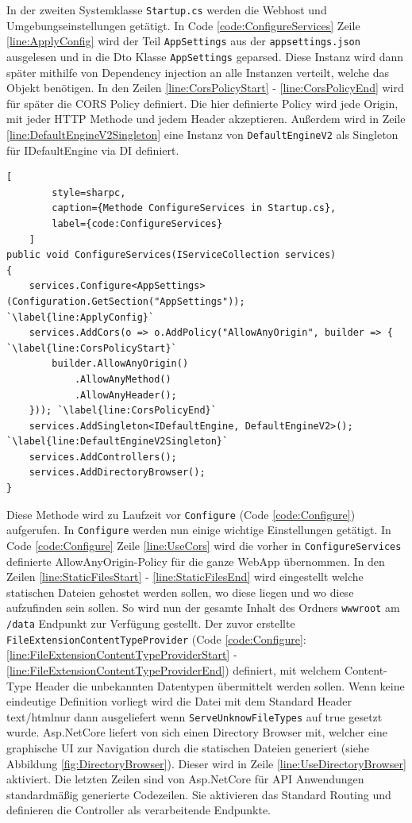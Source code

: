 In der zweiten Systemklasse \texttt{Startup.cs} werden die
Webhost und Umgebungseinstellungen getätigt.
In Code \ref{code:ConfigureServices} Zeile \ref{line:ApplyConfig}
wird der Teil \texttt{AppSettings} aus der
\texttt{appsettings.json} ausgelesen und in die Dto Klasse
\texttt{AppSettings} geparsed. Diese Instanz wird dann später
mithilfe von Dependency injection an alle Instanzen verteilt,
welche das Objekt benötigen. In den Zeilen \ref{line:CorsPolicyStart}
- \ref{line:CorsPolicyEnd} wird für später die CORS Policy definiert.
Die hier definierte Policy wird jede Origin, mit jeder HTTP Methode
und jedem Header akzeptieren. Außerdem wird in Zeile
\ref{line:DefaultEngineV2Singleton} eine Instanz von \texttt{DefaultEngineV2}
als Singleton für IDefaultEngine via DI definiert.

\begin{codeblock}
	\begin{lstlisting}[
		style=sharpc,
		caption={Methode ConfigureServices in Startup.cs},
		label={code:ConfigureServices}
	]
public void ConfigureServices(IServiceCollection services)
{
	services.Configure<AppSettings>(Configuration.GetSection("AppSettings"));	`\label{line:ApplyConfig}`
	services.AddCors(o => o.AddPolicy("AllowAnyOrigin", builder => { `\label{line:CorsPolicyStart}`
		builder.AllowAnyOrigin()
			.AllowAnyMethod()
			.AllowAnyHeader();
	})); `\label{line:CorsPolicyEnd}`
	services.AddSingleton<IDefaultEngine, DefaultEngineV2>(); `\label{line:DefaultEngineV2Singleton}`
	services.AddControllers();
	services.AddDirectoryBrowser();
}
	\end{lstlisting}
\end{codeblock}

Diese Methode wird zu Laufzeit vor \texttt{Configure}
(Code \ref{code:Configure}) aufgerufen. In \texttt{Configure} werden nun
einige wichtige Einstellungen getätigt. In Code \ref{code:Configure}
Zeile \ref{line:UseCors} wird die vorher in \texttt{ConfigureServices} definierte
\grqq AllowAnyOrigin\grqq -Policy für die ganze WebApp übernommen.
In den Zeilen \ref{line:StaticFilesStart} - \ref{line:StaticFilesEnd}
wird eingestellt welche statischen Dateien gehostet werden sollen,
wo diese liegen und wo diese aufzufinden sein sollen. So wird nun
der gesamte Inhalt des Ordners \texttt{wwwroot} am \texttt{/data} Endpunkt zur
Verfügung gestellt. Der zuvor erstellte \texttt{FileExtensionContentTypeProvider}
(Code \ref{code:Configure}:
\ref{line:FileExtensionContentTypeProviderStart} -
\ref{line:FileExtensionContentTypeProviderEnd})
definiert, mit welchem Content-Type Header die \grqq unbekannten\grqq\space
Datentypen übermittelt werden sollen. Wenn keine eindeutige
Definition vorliegt wird die Datei mit dem Standard Header
\grqq text/html\grqq\space nur dann ausgeliefert wenn \texttt{ServeUnknowFileTypes} auf
true gesetzt wurde.
Asp.NetCore liefert von sich einen Directory Browser mit,
welcher eine graphische UI zur Navigation durch die statischen
Dateien generiert (siehe Abbildung \ref{fig:DirectoryBrowser}).
Dieser wird in Zeile \ref{line:UseDirectoryBrowser} aktiviert.
Die letzten Zeilen sind von Asp.NetCore für API Anwendungen
standardmäßig generierte Codezeilen. Sie aktivieren das Standard
Routing und definieren die Controller als verarbeitende Endpunkte.

